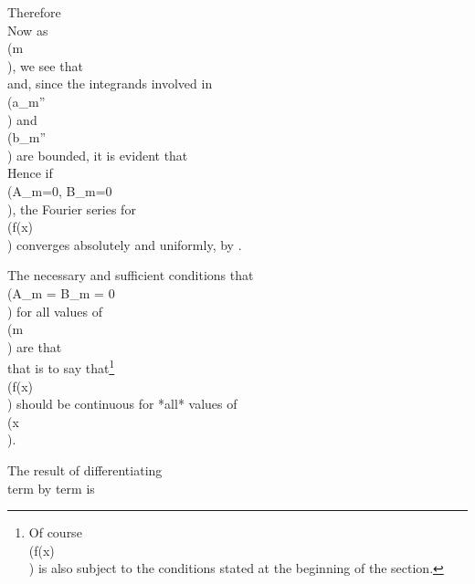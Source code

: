 Therefore
\\[ 
a_{m} =
\frac{A_{m}}{m}
- \frac{B_{m}'}{m^{2}}
- \frac{a_{m}''}{m^{2}},
\quad
b_{m} =
\frac{B_{m}}{m}
+ \frac{A_{m}'}{m^{2}}
- \frac{b_{m}''}{m^{2}},
\\] 

Now as \\(m \rightarrow \infty\\), we see that
\\[ 
A_{m}' = \bigo(1),
\quad
B_{m}' = \bigo(1),
\\] 
and, since the integrands involved in \\(a_{m}''\\) and \\(b_{m}''\\)
are bounded, it is evident that
\\[ 
a_{m}'' = \bigo(1),
\quad
b_{m}'' = \bigo(1).
\\] 

Hence if \\(A_{m}=0, B_{m}=0\\), the Fourier series for \\(f(x)\\) converges
absolutely and uniformly, by .

The necessary and sufficient conditions that
\\(A_{m} = B_{m} = 0\\) for all values of \\(m\\) are that
\\[ 
f(k_{r} - 0) = f(k_{r} + 0),
\quad
f(\pi - 0) = f(-\pi + 0)
\\] 
that is to say that\footnote{Of course \\(f(x)\\) is also subject to the conditions stated at the
beginning of the section.} \\(f(x)\\) should be continuous for *all* values of \\(x\\).

The result of differentiating
\\[ 
\frac{1}{2} a_{0}
+ \sum_{m=1}^{\infty} (a_{m} \cos mx + b_{m} \sin mx)
\\] 
term by term is
\\[ 
\sum_{m=1}^{\infty} \left\{
  m b_{m} \cos mx
  -
  m a_{m} \sin mx
\right\}.
\\] 
%
%

